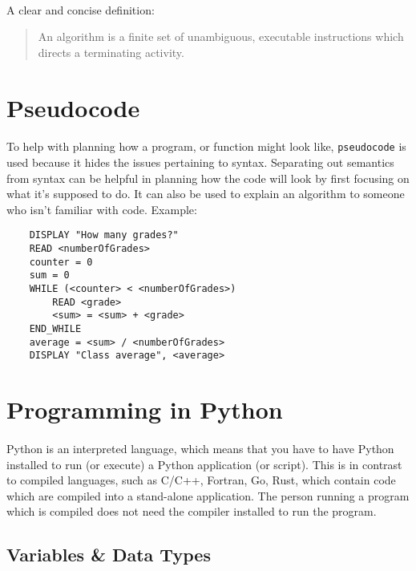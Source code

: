 \documentclass[letter,10pt]{article}
\begin{document}
\paragraph{}A clear and concise definition:
\begin{quote}
An algorithm is a finite set of unambiguous, executable instructions which directs a terminating activity.
\end{quote}

\section{Pseudocode}
\paragraph{}To help with planning how a program, or function might look like, \texttt{pseudocode} is used because it hides the issues pertaining to syntax. Separating out semantics from syntax can be helpful in planning how the code will look by first focusing on what it's supposed to do. It can also be used to explain an algorithm to someone who isn't familiar with code. Example:

\begin{verbatim}
    DISPLAY "How many grades?"
    READ <numberOfGrades>
    counter = 0
    sum = 0
    WHILE (<counter> < <numberOfGrades>)
        READ <grade>
        <sum> = <sum> + <grade>
    END_WHILE
    average = <sum> / <numberOfGrades>
    DISPLAY "Class average", <average>
\end{verbatim}

\section{Programming in Python}
\paragraph{}Python is an interpreted language, which means that you have to have Python installed to run (or execute) a Python application (or script). This is in contrast to compiled languages, such as C/C++, Fortran, Go, Rust, which contain code which are compiled into a stand-alone application. The person running a program which is compiled does not need the compiler installed to run the program.

\subsection{Variables \& Data Types}
\end{document}
